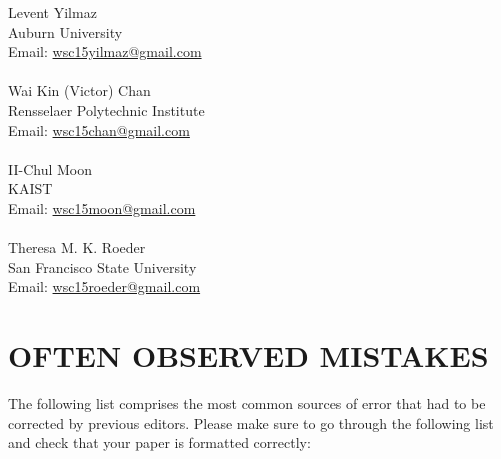 \documentclass{wscpaperproc}
\theoremstyle{wsc}
\begin{document}
\noindent Levent Yilmaz\\
Auburn University\\
Email: \href{mailto://wsc15yilmaz@gmail.com}{wsc15yilmaz@gmail.com}\\
\\
Wai Kin (Victor) Chan\\
Rensselaer Polytechnic Institute\\
Email: \href{mailto://wsc15chan@gmail.com}{wsc15chan@gmail.com}\\
\\
II-Chul Moon\\
KAIST\\
Email: \href{mailto://wsc15moon@gmail.com}{wsc15moon@gmail.com}\\
\\
Theresa M. K. Roeder\\
San Francisco State University\\
Email: \href{mailto://wsc15roeder@gmail.com}{wsc15roeder@gmail.com}\\

\section{OFTEN OBSERVED MISTAKES}

The following list comprises the most common sources of error that had to be corrected by previous editors. Please make sure to go through the following list and check that your paper is formatted correctly:
\end{document}
